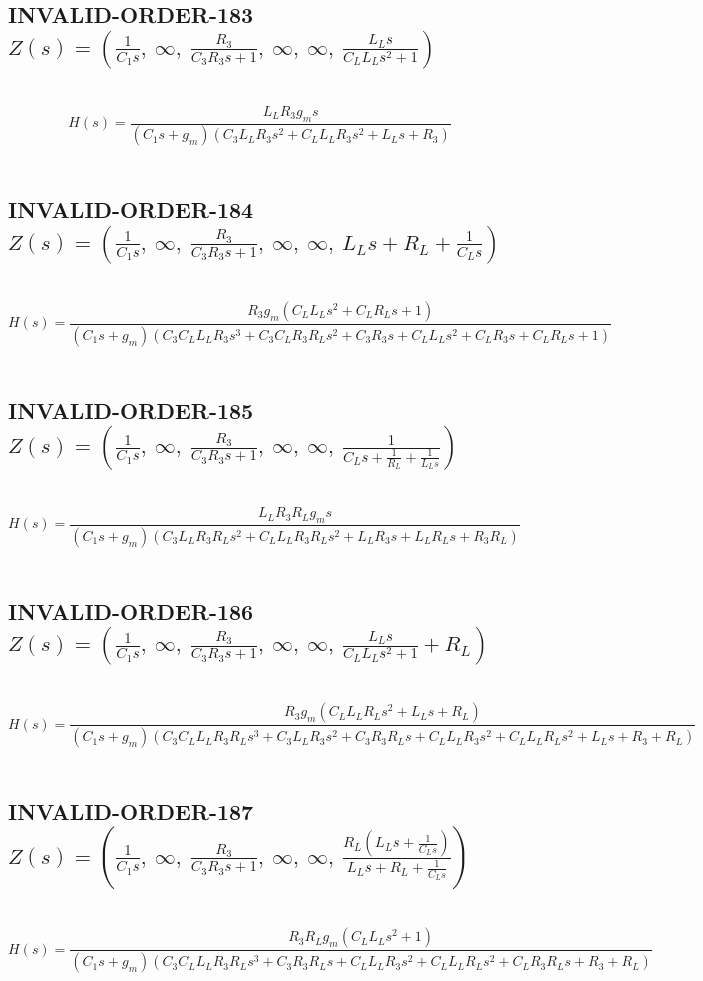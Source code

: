 \documentclass{article}
\begin{document}
\subsection{INVALID-ORDER-183 $Z(s) = \left( \frac{1}{C_{1} s}, \  \infty, \  \frac{R_{3}}{C_{3} R_{3} s + 1}, \  \infty, \  \infty, \  \frac{L_{L} s}{C_{L} L_{L} s^{2} + 1}\right)$ } \ 
\textbf{\[H(s) = \frac{L_{L} R_{3} g_{m} s}{\left(C_{1} s + g_{m}\right) \left(C_{3} L_{L} R_{3} s^{2} + C_{L} L_{L} R_{3} s^{2} + L_{L} s + R_{3}\right)}\] } \ 
\subsection{INVALID-ORDER-184 $Z(s) = \left( \frac{1}{C_{1} s}, \  \infty, \  \frac{R_{3}}{C_{3} R_{3} s + 1}, \  \infty, \  \infty, \  L_{L} s + R_{L} + \frac{1}{C_{L} s}\right)$ } \ 
\textbf{\[H(s) = \frac{R_{3} g_{m} \left(C_{L} L_{L} s^{2} + C_{L} R_{L} s + 1\right)}{\left(C_{1} s + g_{m}\right) \left(C_{3} C_{L} L_{L} R_{3} s^{3} + C_{3} C_{L} R_{3} R_{L} s^{2} + C_{3} R_{3} s + C_{L} L_{L} s^{2} + C_{L} R_{3} s + C_{L} R_{L} s + 1\right)}\] } \ 
\subsection{INVALID-ORDER-185 $Z(s) = \left( \frac{1}{C_{1} s}, \  \infty, \  \frac{R_{3}}{C_{3} R_{3} s + 1}, \  \infty, \  \infty, \  \frac{1}{C_{L} s + \frac{1}{R_{L}} + \frac{1}{L_{L} s}}\right)$ } \ 
\textbf{\[H(s) = \frac{L_{L} R_{3} R_{L} g_{m} s}{\left(C_{1} s + g_{m}\right) \left(C_{3} L_{L} R_{3} R_{L} s^{2} + C_{L} L_{L} R_{3} R_{L} s^{2} + L_{L} R_{3} s + L_{L} R_{L} s + R_{3} R_{L}\right)}\] } \ 
\subsection{INVALID-ORDER-186 $Z(s) = \left( \frac{1}{C_{1} s}, \  \infty, \  \frac{R_{3}}{C_{3} R_{3} s + 1}, \  \infty, \  \infty, \  \frac{L_{L} s}{C_{L} L_{L} s^{2} + 1} + R_{L}\right)$ } \ 
\textbf{\[H(s) = \frac{R_{3} g_{m} \left(C_{L} L_{L} R_{L} s^{2} + L_{L} s + R_{L}\right)}{\left(C_{1} s + g_{m}\right) \left(C_{3} C_{L} L_{L} R_{3} R_{L} s^{3} + C_{3} L_{L} R_{3} s^{2} + C_{3} R_{3} R_{L} s + C_{L} L_{L} R_{3} s^{2} + C_{L} L_{L} R_{L} s^{2} + L_{L} s + R_{3} + R_{L}\right)}\] } \ 
\subsection{INVALID-ORDER-187 $Z(s) = \left( \frac{1}{C_{1} s}, \  \infty, \  \frac{R_{3}}{C_{3} R_{3} s + 1}, \  \infty, \  \infty, \  \frac{R_{L} \left(L_{L} s + \frac{1}{C_{L} s}\right)}{L_{L} s + R_{L} + \frac{1}{C_{L} s}}\right)$ } \ 
\textbf{\[H(s) = \frac{R_{3} R_{L} g_{m} \left(C_{L} L_{L} s^{2} + 1\right)}{\left(C_{1} s + g_{m}\right) \left(C_{3} C_{L} L_{L} R_{3} R_{L} s^{3} + C_{3} R_{3} R_{L} s + C_{L} L_{L} R_{3} s^{2} + C_{L} L_{L} R_{L} s^{2} + C_{L} R_{3} R_{L} s + R_{3} + R_{L}\right)}\] } \ 
\end{document}
